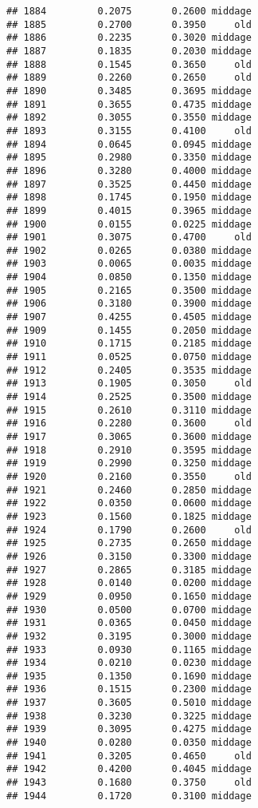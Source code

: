 \documentclass[
]{article}
\begin{document}
\begin{verbatim}
## 1884         0.2075       0.2600 middage
## 1885         0.2700       0.3950     old
## 1886         0.2235       0.3020 middage
## 1887         0.1835       0.2030 middage
## 1888         0.1545       0.3650     old
## 1889         0.2260       0.2650     old
## 1890         0.3485       0.3695 middage
## 1891         0.3655       0.4735 middage
## 1892         0.3055       0.3550 middage
## 1893         0.3155       0.4100     old
## 1894         0.0645       0.0945 middage
## 1895         0.2980       0.3350 middage
## 1896         0.3280       0.4000 middage
## 1897         0.3525       0.4450 middage
## 1898         0.1745       0.1950 middage
## 1899         0.4015       0.3965 middage
## 1900         0.0155       0.0225 middage
## 1901         0.3075       0.4700     old
## 1902         0.0265       0.0380 middage
## 1903         0.0065       0.0035 middage
## 1904         0.0850       0.1350 middage
## 1905         0.2165       0.3500 middage
## 1906         0.3180       0.3900 middage
## 1907         0.4255       0.4505 middage
## 1909         0.1455       0.2050 middage
## 1910         0.1715       0.2185 middage
## 1911         0.0525       0.0750 middage
## 1912         0.2405       0.3535 middage
## 1913         0.1905       0.3050     old
## 1914         0.2525       0.3500 middage
## 1915         0.2610       0.3110 middage
## 1916         0.2280       0.3600     old
## 1917         0.3065       0.3600 middage
## 1918         0.2910       0.3595 middage
## 1919         0.2990       0.3250 middage
## 1920         0.2160       0.3550     old
## 1921         0.2460       0.2850 middage
## 1922         0.0350       0.0600 middage
## 1923         0.1560       0.1825 middage
## 1924         0.1790       0.2600     old
## 1925         0.2735       0.2650 middage
## 1926         0.3150       0.3300 middage
## 1927         0.2865       0.3185 middage
## 1928         0.0140       0.0200 middage
## 1929         0.0950       0.1650 middage
## 1930         0.0500       0.0700 middage
## 1931         0.0365       0.0450 middage
## 1932         0.3195       0.3000 middage
## 1933         0.0930       0.1165 middage
## 1934         0.0210       0.0230 middage
## 1935         0.1350       0.1690 middage
## 1936         0.1515       0.2300 middage
## 1937         0.3605       0.5010 middage
## 1938         0.3230       0.3225 middage
## 1939         0.3095       0.4275 middage
## 1940         0.0280       0.0350 middage
## 1941         0.3205       0.4650     old
## 1942         0.4200       0.4045 middage
## 1943         0.1680       0.3750     old
## 1944         0.1720       0.3100 middage

\end{verbatim}
\end{document}
